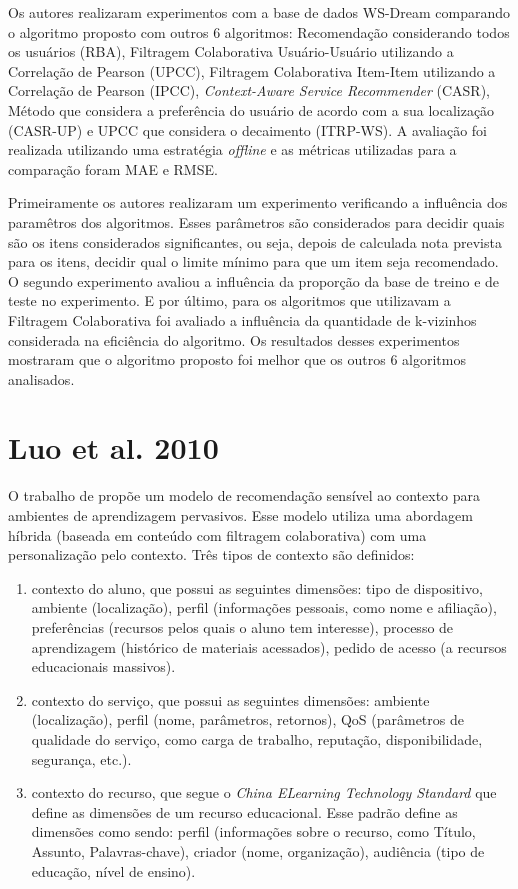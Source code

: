 Os autores realizaram experimentos com a base de dados WS-Dream comparando o algoritmo proposto com outros 6 algoritmos: Recomendação
considerando todos os usuários (RBA), Filtragem Colaborativa Usuário-Usuário utilizando a Correlação de Pearson (UPCC),
Filtragem Colaborativa Item-Item utilizando a Correlação de Pearson (IPCC), \textit{Context-Aware Service Recommender}
(CASR), Método que considera a preferência do usuário de acordo com a sua localização (CASR-UP) e UPCC que considera o
decaimento (ITRP-WS). A avaliação foi realizada utilizando uma estratégia \textit{offline} e as métricas utilizadas para
a comparação foram MAE e RMSE.

Primeiramente os autores realizaram um experimento verificando a influência dos paramêtros dos algoritmos. Esses parâmetros são
considerados para decidir quais são os itens considerados significantes, ou seja, depois de calculada nota prevista para
os itens, decidir qual o limite mínimo para que um item seja recomendado. O segundo experimento avaliou a influência da
proporção da base de treino e de teste no experimento. E por último, para os algoritmos que utilizavam a Filtragem
Colaborativa foi avaliado a influência da quantidade de k-vizinhos considerada na eficiência do algoritmo. Os resultados
desses experimentos mostraram que o algoritmo proposto foi melhor que os outros 6 algoritmos analisados.

\section{Luo et al. 2010}

O trabalho de  propõe um modelo de recomendação sensível ao contexto para ambientes de
aprendizagem pervasivos. Esse modelo utiliza uma abordagem híbrida (baseada em conteúdo com filtragem colaborativa)
com uma personalização pelo contexto. Três tipos de contexto são definidos:

\begin{enumerate}
\item contexto do aluno, que possui as seguintes dimensões: tipo de dispositivo, ambiente (localização), perfil
(informações pessoais, como nome e afiliação), preferências (recursos pelos quais o aluno tem interesse), processo de
aprendizagem (histórico de materiais acessados), pedido de acesso (a recursos educacionais massivos).
\item contexto do serviço, que possui as seguintes dimensões: ambiente (localização), perfil (nome, parâmetros,
retornos), QoS (parâmetros de qualidade do serviço, como carga de trabalho, reputação, disponibilidade, segurança, etc.).
\item contexto do recurso, que segue o \textit{China ELearning Technology Standard} que define as dimensões de um recurso
educacional. Esse padrão define as dimensões como sendo: perfil (informações sobre o recurso, como Título, Assunto,
Palavras-chave), criador (nome, organização), audiência (tipo de educação, nível de ensino).
\end{enumerate}

